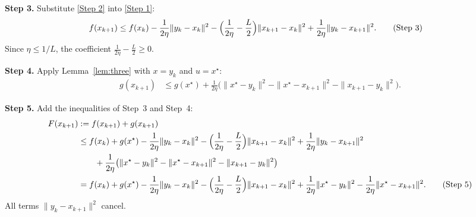 \documentclass{article}
\begin{document}
\noindent\textbf{Step 3.} Substitute \eqref{Step 2} into \eqref{Step 1}:
\begin{align}
f(x_{k+1})
&\le f(x_k)
   -\frac{1}{2\eta}\|y_k-x_k\|^2
   -\Bigl(\frac{1}{2\eta}-\frac{L}{2}\Bigr)\|x_{k+1}-x_k\|^2
   +\frac{1}{2\eta}\|y_k-x_{k+1}\|^2 .
   \tag{Step 3}
\end{align}
Since $\eta\le 1/L$, the coefficient $\frac{1}{2\eta}-\frac{L}{2}\ge0$.

\noindent\textbf{Step 4.} Apply Lemma~\ref{lem:three} with $x=y_k$ and $u=x^\star$:
\begin{align}
g(x_{k+1})
&\le g(x^\star)
   +\frac{1}{2\eta}\bigl(\|x^\star-y_k\|^2-\|x^\star-x_{k+1}\|^2
                         -\|x_{k+1}-y_k\|^2\bigr). \tag{Step 4}
\end{align}

\noindent\textbf{Step 5.} Add the inequalities of Step~3 and Step~4:
\begin{align}
F(x_{k+1}) &:= f(x_{k+1})+g(x_{k+1}) \nonumber\\
&\le f(x_k)+g(x^\star)
   -\frac{1}{2\eta}\|y_k-x_k\|^2
   -\Bigl(\frac{1}{2\eta}-\frac{L}{2}\Bigr)\|x_{k+1}-x_k\|^2
   +\frac{1}{2\eta}\|y_k-x_{k+1}\|^2 \nonumber\\
&\qquad +\frac{1}{2\eta}\bigl(\|x^\star-y_k\|^2-\|x^\star-x_{k+1}\|^2
                         -\|x_{k+1}-y_k\|^2\bigr) \nonumber\\
&= f(x_k)+g(x^\star)
   -\frac{1}{2\eta}\|y_k-x_k\|^2
   -\Bigl(\frac{1}{2\eta}-\frac{L}{2}\Bigr)\|x_{k+1}-x_k\|^2
   +\frac{1}{2\eta}\|x^\star-y_k\|^2
   -\frac{1}{2\eta}\|x^\star-x_{k+1}\|^2 . \tag{Step 5}
\end{align}
All terms $\|y_k-x_{k+1}\|^2$ cancel.
\end{document}
